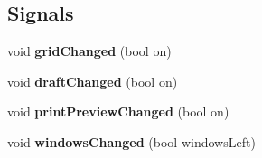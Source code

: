 \subsection*{Signals}
\begin{DoxyCompactItemize}
\item 
\hypertarget{classQC__ApplicationWindow_a33a9f5948d665e17e0c98dac9b5609e5}{void {\bfseries grid\-Changed} (bool on)}\label{classQC__ApplicationWindow_a33a9f5948d665e17e0c98dac9b5609e5}

\item 
\hypertarget{classQC__ApplicationWindow_ac69717f5d376da17a962bb70c247ec2b}{void {\bfseries draft\-Changed} (bool on)}\label{classQC__ApplicationWindow_ac69717f5d376da17a962bb70c247ec2b}

\item 
\hypertarget{classQC__ApplicationWindow_aa3103d95b0ed4f80b7abb55604ca478d}{void {\bfseries print\-Preview\-Changed} (bool on)}\label{classQC__ApplicationWindow_aa3103d95b0ed4f80b7abb55604ca478d}

\item 
\hypertarget{classQC__ApplicationWindow_ad49da489ffdc542ba20d546038d18ede}{void {\bfseries windows\-Changed} (bool windows\-Left)}\label{classQC__ApplicationWindow_ad49da489ffdc542ba20d546038d18ede}

\end{DoxyCompactItemize}
